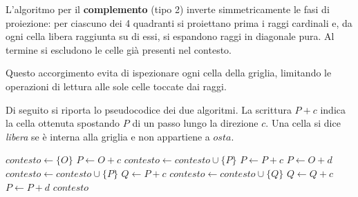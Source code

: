 L'algoritmo per il \textbf{complemento} (tipo 2) inverte simmetricamente le fasi di proiezione: per ciascuno dei 4 quadranti si proiettano prima i raggi cardinali e, da ogni cella libera raggiunta su di essi, si espandono raggi in diagonale pura. Al termine si escludono le celle già presenti nel contesto.

Questo accorgimento evita di ispezionare ogni cella della griglia, limitando le operazioni di lettura alle sole celle toccate dai raggi.

Di seguito si riporta lo pseudocodice dei due algoritmi. La scrittura $P + c$ indica la cella ottenuta spostando $P$ di un passo lungo la direzione $c$. Una cella si dice \emph{libera} se è interna alla griglia e non appartiene a $osta$.

\begin{algorithm}[H]
\caption{Calcolo del contesto (celle raggiungibili con cammini liberi di tipo 1)}
\label{alg:calcola_contesto}
\begin{algorithmic}[1]
    \State $contesto \leftarrow \{O\}$
        \State $P \leftarrow O + c$
            \State $contesto \leftarrow contesto \cup \{P\}$
            \State $P \leftarrow P + c$
        \EndWhile
    \EndFor
        \State $P \leftarrow O + d$
            \State $contesto \leftarrow contesto \cup \{P\}$
            \State {}
                \State $Q \leftarrow P + c$
                    \State $contesto \leftarrow contesto \cup \{Q\}$
                    \State $Q \leftarrow Q + c$
                \EndWhile
            \EndFor
            \State $P \leftarrow P + d$
        \EndWhile
    \EndFor
    \State \Return $contesto$
\EndProcedure
\end{algorithmic}
\end{algorithm}

